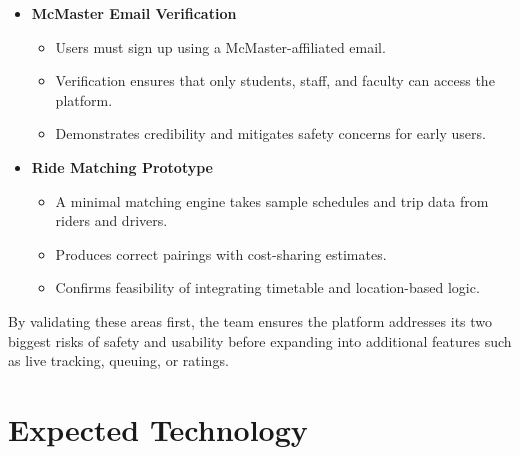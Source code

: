 \documentclass{article}
\begin{document}
\begin{itemize}
  \item \textbf{McMaster Email Verification}
  \begin{itemize}
      \item Users must sign up using a McMaster-affiliated email.
      \item Verification ensures that only students, staff, and faculty can access the platform.
      \item Demonstrates credibility and mitigates safety concerns for early users.
  \end{itemize}

  \item \textbf{Ride Matching Prototype}
  \begin{itemize}
      \item A minimal matching engine takes sample schedules and trip data from riders and drivers.
      \item Produces correct pairings with cost-sharing estimates.
      \item Confirms feasibility of integrating timetable and location-based logic.
  \end{itemize}
\end{itemize}

By validating these areas first, the team ensures the platform addresses its two biggest risks of safety and usability before expanding into additional features such as live tracking, queuing, or ratings.


\section{Expected Technology}


\end{document}
